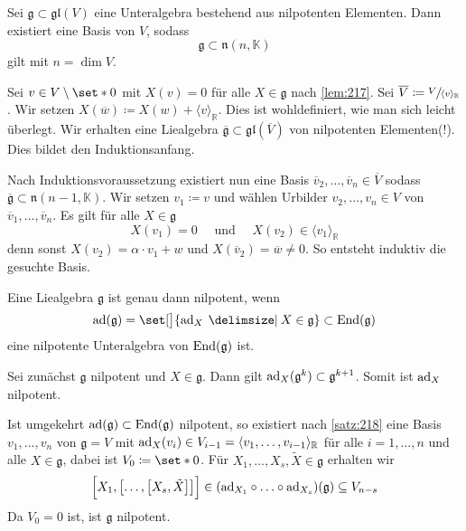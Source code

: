 \begin{satz}[name={Engel},label=satz:218]
	Sei $\mathfrak{g} \subset \mathfrak{gl}(V)$ eine Unteralgebra bestehend aus nilpotenten Elementen.
	Dann existiert eine Basis von $V$, sodass 
	\[
		\mathfrak{g} \subset \mathfrak{n}(n,\mathbb{K})  
	\]
	gilt mit $n = \dim V$.
\end{satz}
\begin{beweis}
	Sei $v \in V \setminus \set*{0}$ mit $X(v)=0$ für alle $X \in \mathfrak{g}$ nach \autoref{lem:217}.
	Sei $\overline{V} \coloneqq \sfrac{V}{\langle v \rangle_\mathbb{R}}$.
	Wir setzen $X(\overline{w}) \coloneqq X(w) + \langle v \rangle_\mathbb{R}$.
	Dies ist wohldefiniert, wie man sich leicht überlegt.
	Wir erhalten eine Liealgebra $\overline{\mathfrak{g}} \subset \mathfrak{gl}(\overline{V})$ von nilpotenten Elementen(!).
	Dies bildet den Induktionsanfang.
	
	Nach Induktionsvoraussetzung existiert nun eine Basis $\overline{v}_2, \ldots , \overline{v}_{n} \in \overline{V}$ sodass $\overline{\mathfrak{g}} \subset \mathfrak{n}(n-1,\mathbb{K})$.
	Wir setzen $v_1 \coloneqq v$ und wählen Urbilder $v_2, \ldots ,v_n \in V$ von $\overline{v}_1, \ldots ,\overline{v}_n$.
	Es gilt für alle $X \in \mathfrak{g}$
	\[
		X(v_1) =0 \quad \text{ und } \quad X(v_2) \in \langle v_1 \rangle_\mathbb{R}
	\]
	denn sonst $X(v_2) = \alpha \cdot v_1 + w$ und $X(\overline{v}_2)=\overline{w}\neq 0$.
	So entsteht induktiv die gesuchte Basis.
\end{beweis}

\begin{korollar}[label=korr:219,{name=[Charakterisierung von Nilpotenz einer Liealgebra]}]
	Eine Liealgebra $\mathfrak{g}$ ist genau dann nilpotent, wenn 
	\[
		\ad(\mathfrak{g}) = \set[\big]{\ad_X \given X \in \mathfrak{g}} \subset \End(\mathfrak{g})
	\]
	eine nilpotente Unteralgebra von $\operatorname{End}(\mathfrak{g})$ ist.
\end{korollar}
\begin{beweis}
	Sei zunächst $\mathfrak{g}$ nilpotent und $X \in \mathfrak{g}$.
	Dann gilt $\operatorname{ad}_X(\mathfrak{g}^k) \subset \mathfrak{g}^{k+1}$.
	Somit ist $\operatorname{ad}_X$ nilpotent.
	
	Ist umgekehrt $\operatorname{ad}(\mathfrak{g}) \subset \operatorname{End}(\mathfrak{g})$ nilpotent, so existiert nach \autoref{satz:218} eine Basis $v_1, \ldots ,v_n$ von $\mathfrak{g}=V$ mit $\operatorname{ad}_X(v_i) \in V_{i-1} = \langle v_1 ,\ldots ,v_{i-1}\rangle_\mathbb{R}$ für alle $i=1,\ldots ,n$ und alle $X \in \mathfrak{g}$, dabei ist $V_0 \coloneqq \set*{0}$.
	Für $X_1, \ldots ,X_s, \tilde{X} \in \mathfrak{g}$ erhalten wir 
	\[
		 \benbrace[\Big]{X_1,  \benbrace[\big]{\ldots ,\benbrace*{X_s,\tilde{X}}}} \in \enbrace*{{\ad_{X_1}} \circ \ldots \circ {\ad_{X_s}}}(\mathfrak{g}) \subseteq V_{n-s}
	\]
	Da $V_0=0$ ist, ist $\mathfrak{g}$ nilpotent.
\end{beweis}


